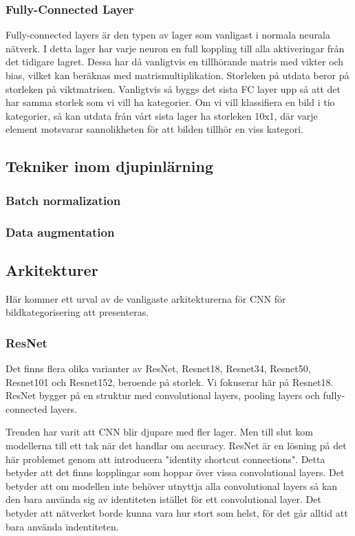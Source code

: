 \documentclass{kththesis}
\begin{document}
      \subsubsection{Fully-Connected Layer}
      Fully-connected layers är den typen av lager som vanligast i normala neurala nätverk.
      I detta lager har varje neuron en full koppling till alla aktiveringar från det tidigare lagret.
      Dessa har då vanligtvis en tillhörande matris med vikter och bias, vilket kan beräknas med matrismultiplikation.
      Storleken på utdata beror på storleken på viktmatrisen.
      Vanligtvis så byggs det sista FC layer upp så att det har samma storlek som vi vill ha kategorier.
      Om vi vill klassifiera en bild i tio kategorier, så kan utdata från vårt sista lager ha storleken 10x1, där varje element motsvarar sannolikheten för att bilden tillhör en viss kategori.

    \subsection{Tekniker inom djupinlärning}

      \subsubsection{Batch normalization}

      \subsubsection{Data augmentation}

    \subsection{Arkitekturer}
    Här kommer ett urval av de vanligaste arkitekturerna för CNN för bildkategorisering att presenteras.

      \subsubsection{ResNet}
      Det finns flera olika varianter av ResNet, Resnet18, Resnet34, Resnet50, Resnet101 och Resnet152, beroende på storlek. Vi fokuserar här på Resnet18.
      ResNet bygger på en struktur med convolutional layers, pooling layers och fully-connected layers.

      Trenden har varit att CNN blir djupare med fler lager.
      Men till slut kom modellerna till ett tak när det handlar om accuracy.
      ResNet är en lösning på det här problemet genom att introducera "identity shortcut connections".
      Detta betyder att det finns kopplingar som hoppar över vissa convolutional layers.
      Det betyder att om modellen inte behöver utnyttja alla convolutional layers så kan den bara använda sig av identiteten istället för ett convolutional layer.
      Det betyder att nätverket borde kunna vara hur stort som helst, för det går alltid att bara använda indentiteten.
\end{document}
